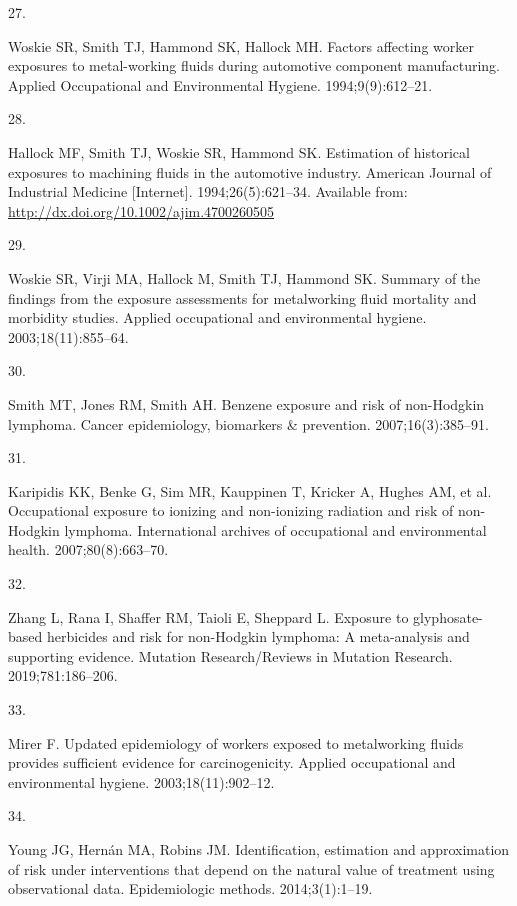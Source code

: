 \documentclass[
  11pt,
  letterpaper,
  DIV=11,
  numbers=noendperiod]{scrartcl}
\newlength{\cslhangindent}
\newlength{\csllabelwidth}
\newenvironment{CSLReferences}[2] %
 {\begin{list}{}{%
  \setlength{\itemindent}{0pt}
  \setlength{\leftmargin}{0pt}
  \setlength{\parsep}{0pt}
  \ifodd #1
   \setlength{\leftmargin}{\cslhangindent}
   \setlength{\itemindent}{-1\cslhangindent}
  \fi
  \setlength{\itemsep}{#2\baselineskip}}}
 {\end{list}}
\newcommand{\CSLLeftMargin}[1]{\parbox[t]{\csllabelwidth}{\strut#1\strut}}
\newcommand{\CSLRightInline}[1]{\parbox[t]{\linewidth - \csllabelwidth}{\strut#1\strut}}
\begin{document}
\begin{CSLReferences}{1}{0}
\CSLLeftMargin{27. }%
\CSLRightInline{Woskie SR, Smith TJ, Hammond SK, Hallock MH. Factors
affecting worker exposures to metal-working fluids during automotive
component manufacturing. Applied Occupational and Environmental Hygiene.
1994;9(9):612--21. }

\CSLLeftMargin{28. }%
\CSLRightInline{Hallock MF, Smith TJ, Woskie SR, Hammond SK. Estimation
of historical exposures to machining fluids in the automotive industry.
American Journal of Industrial Medicine {[}Internet{]}.
1994;26(5):621--34. Available from:
\url{http://dx.doi.org/10.1002/ajim.4700260505}}

\CSLLeftMargin{29. }%
\CSLRightInline{Woskie SR, Virji MA, Hallock M, Smith TJ, Hammond SK.
Summary of the findings from the exposure assessments for metalworking
fluid mortality and morbidity studies. Applied occupational and
environmental hygiene. 2003;18(11):855--64. }

\CSLLeftMargin{30. }%
\CSLRightInline{Smith MT, Jones RM, Smith AH. Benzene exposure and risk
of non-{Hodgkin} lymphoma. Cancer epidemiology, biomarkers \&
prevention. 2007;16(3):385--91. }

\CSLLeftMargin{31. }%
\CSLRightInline{Karipidis KK, Benke G, Sim MR, Kauppinen T, Kricker A,
Hughes AM, et al. Occupational exposure to ionizing and non-ionizing
radiation and risk of non-{Hodgkin} lymphoma. International archives of
occupational and environmental health. 2007;80(8):663--70. }

\CSLLeftMargin{32. }%
\CSLRightInline{Zhang L, Rana I, Shaffer RM, Taioli E, Sheppard L.
Exposure to glyphosate-based herbicides and risk for non-{Hodgkin}
lymphoma: A meta-analysis and supporting evidence. Mutation
Research/Reviews in Mutation Research. 2019;781:186--206. }

\CSLLeftMargin{33. }%
\CSLRightInline{Mirer F. Updated epidemiology of workers exposed to
metalworking fluids provides sufficient evidence for carcinogenicity.
Applied occupational and environmental hygiene. 2003;18(11):902--12. }

\CSLLeftMargin{34. }%
\CSLRightInline{Young JG, Hernán MA, Robins JM. Identification,
estimation and approximation of risk under interventions that depend on
the natural value of treatment using observational data. Epidemiologic
methods. 2014;3(1):1--19. }


\end{CSLReferences}
\end{document}
